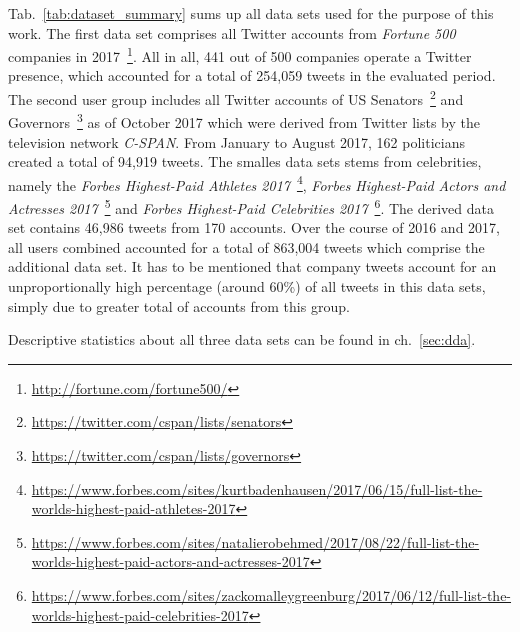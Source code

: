 Tab.~\ref{tab:dataset_summary} sums up all data sets used for the purpose of
this work.
The first data set comprises all Twitter accounts from \textit{Fortune 500}
companies in 2017~\footnote{\url{http://fortune.com/fortune500/}}.
All in all, 441 out of 500 companies operate a Twitter presence, which accounted
for a total of 254,059 tweets in the evaluated period.
The second user group includes all Twitter accounts of US Senators~\footnote{\url{https://twitter.com/cspan/lists/senators}} and Governors~\footnote{\url{https://twitter.com/cspan/lists/governors}}
as of October 2017 which were derived from Twitter lists by the television
network \textit{C-SPAN}.
From January to August 2017, 162 politicians created a total of 94,919 tweets.
The smalles data sets stems from celebrities, namely the \textit{Forbes Highest-Paid
Athletes 2017}~\footnote{\url{https://www.forbes.com/sites/kurtbadenhausen/2017/06/15/full-list-the-worlds-highest-paid-athletes-2017}}, \textit{Forbes Highest-Paid Actors and Actresses 2017}~\footnote{\url{https://www.forbes.com/sites/natalierobehmed/2017/08/22/full-list-the-worlds-highest-paid-actors-and-actresses-2017}} and
\textit{Forbes Highest-Paid Celebrities 2017}~\footnote{\url{https://www.forbes.com/sites/zackomalleygreenburg/2017/06/12/full-list-the-worlds-highest-paid-celebrities-2017}}.
The derived data set contains 46,986 tweets from 170 accounts.
Over the course of 2016 and 2017, all users combined accounted for a total
of 863,004 tweets which comprise the additional data set.
It has to be mentioned that company tweets account for an unproportionally high
percentage (around 60\%) of all tweets in this data sets, simply due to greater
total of accounts from this group.

Descriptive statistics about all three data sets can be found in ch.~\ref{sec:dda}.
